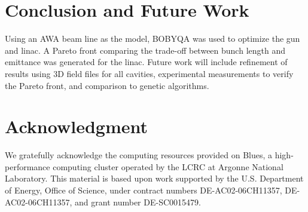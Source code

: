 \documentclass[letterpaper,  %
              ]{jacow}
\begin{document}
\section{Conclusion and Future Work}
Using an AWA beam line as the model, BOBYQA
was used to optimize the gun and linac. A Pareto front 
comparing the trade-off between bunch length and emittance
was generated for the linac. Future work will include
refinement of results using 3D field files for all 
cavities, experimental measurements to verify the 
Pareto front, and comparison to genetic algorithms.

\section{Acknowledgment}
We gratefully acknowledge the computing resources
provided on Blues, a high-performance computing cluster
operated by the LCRC at Argonne National Laboratory.
This material is based upon work supported by the 
U.S. Department of Energy, Office of Science, under 
contract numbers DE-AC02-06CH11357, DE-AC02-06CH11357, 
and grant number DE-SC0015479. 



\end{document}

